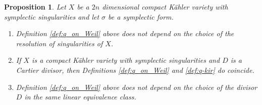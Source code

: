 \documentclass[12pt,reqno]{amsart}
\newtheorem{prop}[thm]{Proposition}
\theoremstyle{plain}
\theoremstyle{definition}
\begin{document}
\begin{prop}\label{prop:ind}
Let $X$ be a $2n$ dimensional compact K\"ahler variety with symplectic singularities and let $\sigma$ be a symplectic form. 
\begin{enumerate}
    \item[a)]  Definition \ref{def:q_on_Weil} above does not depend on the choice of the resolution of singularities of $X$.
    \item[b)] If $X$ is a compact K\"ahler variety with symplectic singularities and $D$ is a Cartier divisor, then Definitions \ref{def:q_on_Weil} and \ref{def:q-kir}
do coincide.
 \item[c)] Definition \ref{def:q_on_Weil} above does not depend on the choice of the divisor $D$ in the same linear equivalence class.  
\end{enumerate}
\end{prop}
\end{document}
